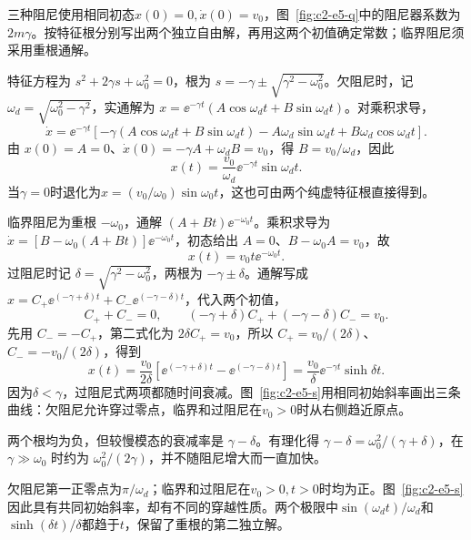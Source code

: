 \begin{solution}
三种阻尼使用相同初态$x(0)=0,\dot x(0)=v_0$，图~\ref{fig:c2-e5-q}中的阻尼器系数为$2m\gamma$。按特征根分别写出两个独立自由解，再用这两个初值确定常数；临界阻尼须采用重根通解。


特征方程为 $s^2+2\gamma s+\omega_0^2=0$，根为 $s=-\gamma\pm\sqrt{\gamma^2-\omega_0^2}$。欠阻尼时，记 $\omega_d=\sqrt{\omega_0^2-\gamma^2}$，实通解为 $x=\ee^{-\gamma t}(A\cos\omega_dt+B\sin\omega_dt)$。对乘积求导，
\[
\dot x=\ee^{-\gamma t}\left[-\gamma(A\cos\omega_dt+B\sin\omega_dt)
-A\omega_d\sin\omega_dt+B\omega_d\cos\omega_dt\right].
\]
由 $x(0)=A=0$、$\dot x(0)=-\gamma A+\omega_dB=v_0$，得 $B=v_0/\omega_d$，因此
\[\boxed{x(t)=\frac{v_0}{\omega_d}\ee^{-\gamma t}\sin\omega_dt}.
\]
当$\gamma=0$时退化为$x=(v_0/\omega_0)\sin\omega_0t$，这也可由两个纯虚特征根直接得到。

临界阻尼为重根 $-\omega_0$，通解 $(A+Bt)\ee^{-\omega_0t}$。乘积求导为 $\dot x=[B-\omega_0(A+Bt)]\ee^{-\omega_0t}$，初态给出 $A=0$、$B-\omega_0A=v_0$，故
\[\boxed{x(t)=v_0t\ee^{-\omega_0t}}.
\]
过阻尼时记 $\delta=\sqrt{\gamma^2-\omega_0^2}$，两根为 $-\gamma\pm\delta$。通解写成 $x=C_+\ee^{(-\gamma+\delta)t}+C_-\ee^{(-\gamma-\delta)t}$，代入两个初值，
\[
C_++C_-=0,\qquad
(-\gamma+\delta)C_++(-\gamma-\delta)C_-=v_0.
\]
先用 $C_-=-C_+$，第二式化为 $2\delta C_+=v_0$，所以 $C_+=v_0/(2\delta)$、$C_-=-v_0/(2\delta)$，得到
\[\boxed{x(t)=\frac{v_0}{2\delta}
\left[\ee^{(-\gamma+\delta)t}-\ee^{(-\gamma-\delta)t}\right]
=\frac{v_0}{\delta}\ee^{-\gamma t}\sinh\delta t}.
\]
因为$\delta<\gamma$，过阻尼式两项都随时间衰减。图~\ref{fig:c2-e5-s}用相同初始斜率画出三条曲线：欠阻尼允许穿过零点，临界和过阻尼在$v_0>0$时从右侧趋近原点。


两个根均为负，但较慢模态的衰减率是 $\gamma-\delta$。有理化得 $\gamma-\delta=\omega_0^2/(\gamma+\delta)$，在 $\gamma\gg\omega_0$ 时约为 $\omega_0^2/(2\gamma)$，并不随阻尼增大而一直加快。

欠阻尼第一正零点为$\pi/\omega_d$；临界和过阻尼在$v_0>0,t>0$时均为正。图~\ref{fig:c2-e5-s}因此具有共同初始斜率，却有不同的穿越性质。两个极限中$\sin(\omega_dt)/\omega_d$和$\sinh(\delta t)/\delta$都趋于$t$，保留了重根的第二独立解。


\end{solution}
